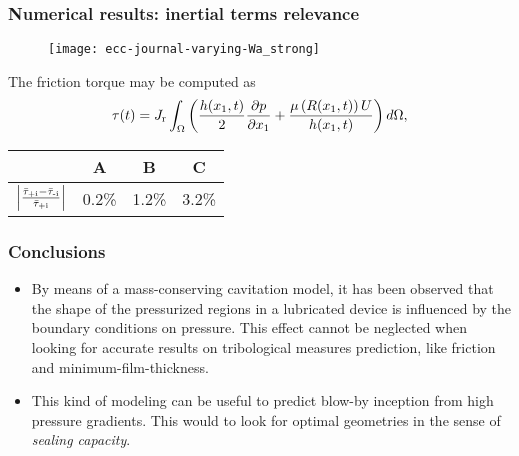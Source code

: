 \documentclass[10pt,aspectratio=169]{beamer}
\begin{document}
\begin{frame}\vspace*{0.5cm}
\frametitle{Numerical results: inertial terms relevance}
\begin{figure}\hspace*{-0.5cm}
	\centering 
	\def\svgwidth{\textwidth}	
	\texttt{[image: ecc-journal-varying-Wa\_strong]}
\end{figure}
\begin{minipage}{.6\linewidth}
	The friction torque may be computed as
\begin{equation*}
\tau(t)=J_\textnormal{r}\int_\Omega\left( \frac{h(x_1,t)}{2}\frac{\partial p}{\partial x_1}+ \frac{\mu\left(R(x_1,t)\right){U}}{h(x_1,t)}\right)d\Omega,
\end{equation*}
\end{minipage}%
\begin{minipage}{.5\linewidth}
\begin{table}[h]
	\begin{center}
		\begin{tabular}{lccc}
			\toprule 
			& A & B & C \\
			\midrule
			$\left|\frac{\bar{\tau}_\textnormal{+i}-\bar{\tau}_\textnormal{-i}}{\bar{\tau}_\textnormal{+i}}\right|$ & 0.2\%& 1.2\% & 3.2\% \\
			\midrule
		\end{tabular} 
	\end{center}
\end{table}
\end{minipage}
\end{frame}  

\begin{frame}
\frametitle{Conclusions}
\begin{itemize}
\item By means of a mass-conserving cavitation model, it has been observed that the shape of the pressurized regions in a lubricated device is influenced by the boundary conditions on pressure. This effect cannot be neglected when looking for accurate results on tribological measures prediction, like friction and minimum-film-thickness.
\item This kind of modeling can be useful to predict blow-by inception from high pressure gradients. This would to look for optimal geometries in the sense of \emph{sealing capacity}.

\end{itemize}
\end{frame}  
\end{document}
